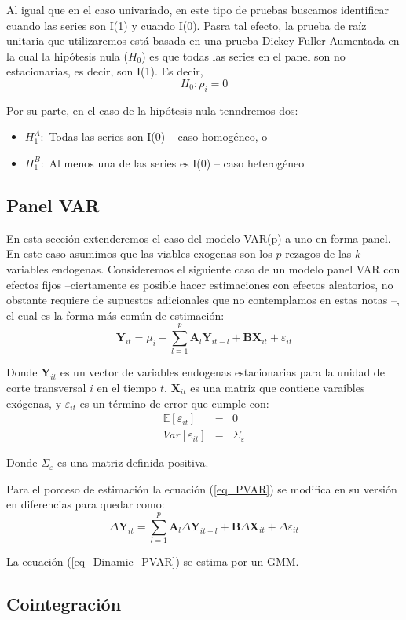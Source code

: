 \documentclass[
  a4paper,
]{article}
\begin{document}
Al igual que en el caso univariado, en este tipo de pruebas buscamos
identificar cuando las series son I(1) y cuando I(0). Pasra tal efecto,
la prueba de raíz unitaria que utilizaremos está basada en una prueba
Dickey-Fuller Aumentada en la cual la hipótesis nula (\(H_0\)) es que
todas las series en el panel son no estacionarias, es decir, son I(1).
Es decir, \[
    H_0 : \rho_i = 0
\]

Por su parte, en el caso de la hipótesis nula tenndremos dos:

\begin{itemize}
    \item $H_1^A :$ Todas las series son I(0) -- caso homogéneo, o
    
    \item $H_1^B :$ Al menos una de las series es I(0) -- caso heterogéneo
\end{itemize}

\hypertarget{panel-var}{%
\subsection{Panel VAR}\label{panel-var}}

En esta sección extenderemos el caso del modelo VAR(p) a uno en forma
panel. En este caso asumimos que las viables exogenas son los \(p\)
rezagos de las \(k\) variables endogenas. Consideremos el siguiente caso
de un modelo panel VAR con efectos fijos --ciertamente es posible hacer
estimaciones con efectos aleatorios, no obstante requiere de supuestos
adicionales que no contemplamos en estas notas --, el cual es la forma
más común de estimación: \[
    \mathbf{Y}_{it} = \mu_i + \sum_{l = 1}^p \mathbf{A}_l \mathbf{Y}_{i t - l} + \mathbf{B} \mathbf{X}_{it} + \varepsilon_{it}
    \label{eq_PVAR}
\]

Donde \(\mathbf{Y}_{it}\) es un vector de variables endogenas
estacionarias para la unidad de corte transversal \(i\) en el tiempo
\(t\), \(\mathbf{X}_{it}\) es una matriz que contiene varaibles
exógenas, y \(\varepsilon_{it}\) es un término de error que cumple con:
\begin{eqnarray*}
    \mathbb{E}[\varepsilon_{it}] & = & 0 \\
    Var[\varepsilon_{it}] & = & \Sigma_\varepsilon
\end{eqnarray*}

Donde \(\Sigma_\varepsilon\) es una matriz definida positiva.

Para el porceso de estimación la ecuación (\ref{eq_PVAR}) se modifica en
su versión en diferencias para quedar como: \[
    \Delta \mathbf{Y}_{it} = \sum_{l = 1}^p \mathbf{A}_l \Delta \mathbf{Y}_{i t - l} + \mathbf{B} \Delta \mathbf{X}_{it} + \Delta \varepsilon_{it}
    \label{eq_Dinamic_PVAR}
\]

La ecuación (\ref{eq_Dinamic_PVAR}) se estima por un GMM.

\hypertarget{cointegraciuxf3n}{%
\subsection{Cointegración}\label{cointegraciuxf3n}}


\printbibliography
\end{document}
